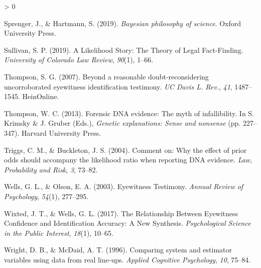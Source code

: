 \documentclass[
  10pt,
  dvipsnames,enabledeprecatedfontcommands]{scrartcl}
\newlength{\cslhangindent}
\newenvironment{CSLReferences}[2] %
 {%
  \setlength{\parindent}{0pt}
  \ifodd #1 \everypar{\setlength{\hangindent}{\cslhangindent}}\ignorespaces\fi
  \ifnum #2 > 0
  \setlength{\parskip}{#2\baselineskip}
  \fi
 }%
 {}
\begin{document}
\begin{CSLReferences}{1}{0}
\leavevmode\hypertarget{ref-sprenger2019bayesian}{}%
Sprenger, J., \& Hartmann, S. (2019). \emph{Bayesian philosophy of
science}. Oxford University Press.

\leavevmode\hypertarget{ref-sullivan2016LikelihoodStoryTheory}{}%
Sullivan, S. P. (2019). A {Likelihood Story}: {The Theory} of {Legal
Fact}-{Finding}. \emph{University of Colorado Law Review}, \emph{90}(1),
1--66.

\leavevmode\hypertarget{ref-thompson2007beyond}{}%
Thompson, S. G. (2007). Beyond a reasonable doubt-reconsidering
uncorroborated eyewitness identification testimony. \emph{UC Davis L.
Rev.}, \emph{41}, 1487--1545. HeinOnline.

\leavevmode\hypertarget{ref-thompson2012forensic}{}%
Thompson, W. C. (2013). Forensic DNA evidence: The myth of
infallibility. In S. Krimsky \& J. Gruber (Eds.), \emph{Genetic
explanations: Sense and nonsense} (pp. 227--347). Harvard University
Press.

\leavevmode\hypertarget{ref-triggsCommentWhyEffect}{}%
Triggs, C. M., \& Buckleton, J. S. (2004). Comment on: {Why} the effect
of prior odds should accompany the likelihood ratio when reporting {DNA}
evidence. \emph{Law, Probability and Risk}, \emph{3}, 73--82.

\leavevmode\hypertarget{ref-wells2003EyewitnessTestimony}{}%
Wells, G. L., \& Olson, E. A. (2003). Eyewitness {Testimony}.
\emph{Annual Review of Psychology}, \emph{54}(1), 277--295.

\leavevmode\hypertarget{ref-wixted2017RelationshipEyewitnessConfidence}{}%
Wixted, J. T., \& Wells, G. L. (2017). The {Relationship Between
Eyewitness Confidence} and {Identification Accuracy}: {A New Synthesis}.
\emph{Psychological Science in the Public Interest}, \emph{18}(1),
10--65.

\leavevmode\hypertarget{ref-Wright1996ComparingSystemEstimator}{}%
Wright, D. B., \& McDaid, A. T. (1996). Comparing system and estimator
variables using data from real line-ups. \emph{Applied Cognitive
Psychology}, \emph{10}, 75--84.

\end{CSLReferences}
\end{document}

